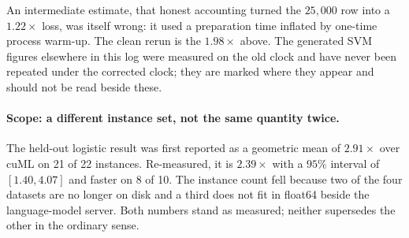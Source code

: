 An intermediate estimate, that honest accounting turned the $25{,}000$ row into
a $1.22\times$ loss, was itself wrong: it used a preparation time inflated by
one-time process warm-up. The clean rerun is the $1.98\times$ above. The
generated SVM figures elsewhere in this log were measured on the old clock and
have never been repeated under the corrected clock; they are marked where they
appear and should not be read beside these.

\paragraph{Scope: a different instance set, not the same quantity twice.}
The held-out logistic result was first reported as a geometric mean of
$2.91\times$ over cuML on 21 of 22 instances. Re-measured, it is $2.39\times$
with a $95\%$ interval of $[1.40, 4.07]$ and faster on 8 of 10. The instance
count fell because two of the four datasets are no longer on disk and a third
does not fit in float64 beside the language-model server. Both numbers stand
as measured; neither supersedes the other in the ordinary sense.

